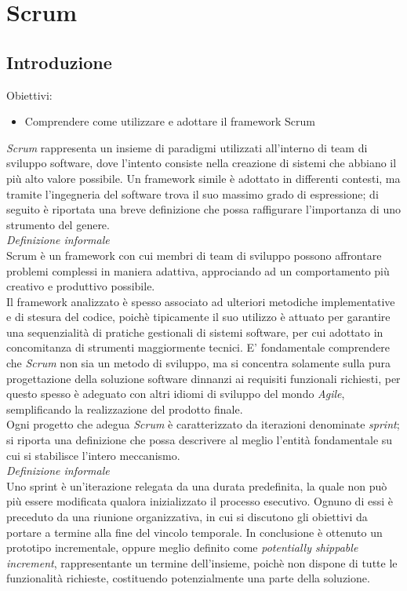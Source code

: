 \documentclass{article}
\begin{document}
\pagestyle{empty}
\section*{Scrum}

\subsection*{Introduzione}
\large
Obiettivi:
\begin{itemize}
    \renewcommand{\labelitemi}{-}
    \itemsep0em
    \item Comprendere come utilizzare e adottare il framework Scrum 
\end{itemize}
\textit{Scrum} rappresenta un insieme di paradigmi utilizzati all'interno di team di sviluppo software, dove l'intento consiste nella creazione di sistemi che abbiano il più alto valore possibile.
Un framework simile è adottato in differenti contesti, ma tramite l'ingegneria del software trova il suo massimo grado di espressione; di seguito è riportata una breve definizione che possa raffigurare l'importanza di uno strumento del genere.\vspace*{14pt}\\
\textit{Definizione informale}\\
Scrum è un framework con cui membri di team di sviluppo possono affrontare problemi complessi in maniera adattiva, approciando ad un comportamento più creativo e produttivo possibile.\vspace*{14pt}\\
Il framework analizzato è spesso associato ad ulteriori metodiche implementative e di stesura del codice, poichè tipicamente il suo utilizzo è attuato per garantire una sequenzialità di pratiche gestionali di sistemi software, per cui adottato in concomitanza di strumenti maggiormente tecnici.
E' fondamentale comprendere che \textit{Scrum} non sia un metodo di sviluppo, ma si concentra solamente sulla pura progettazione della soluzione software dinnanzi ai requisiti funzionali richiesti, per questo spesso è adeguato con altri idiomi di sviluppo del mondo \textit{Agile}, semplificando la realizzazione del prodotto finale.\vspace*{14pt}\\
Ogni progetto che adegua \textit{Scrum} è caratterizzato da iterazioni denominate \textit{sprint}; si riporta una definizione che possa descrivere al meglio l'entità fondamentale su cui si stabilisce l'intero meccanismo.\vspace*{14pt}\\
\textit{Definizione informale}\\
Uno sprint è un'iterazione relegata da una durata predefinita, la quale non può più essere modificata qualora inizializzato il processo esecutivo. Ognuno di essi è preceduto da una riunione organizzativa, in cui si discutono gli obiettivi da portare a termine alla fine del vincolo temporale. In conclusione è ottenuto un prototipo incrementale, oppure meglio definito come \textit{potentially shippable increment}, rappresentante un termine dell'insieme, poichè non dispone di tutte le funzionalità richieste, costituendo potenzialmente una parte della soluzione.
\end{document}
